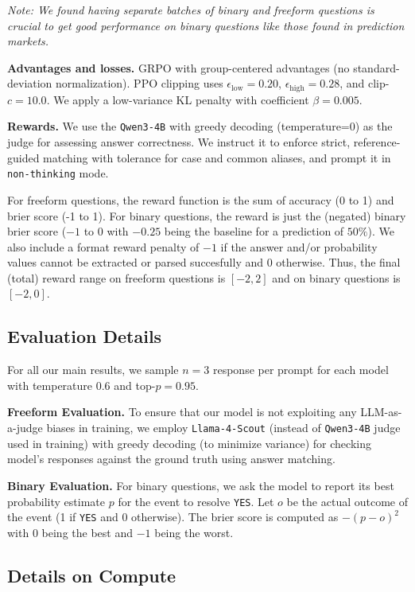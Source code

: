 \emph{{Note:} We found having separate batches of binary and freeform questions is {crucial} to get good performance on binary questions like those found in prediction markets.}

\textbf{Advantages and losses.} GRPO with group-centered advantages (no standard-deviation normalization). PPO clipping uses $\epsilon_{\text{low}}{=}0.20$, $\epsilon_{\text{high}}{=}0.28$, and clip-$c{=}10.0$. We apply a low-variance KL penalty with coefficient $\beta{=}0.005$.

\textbf{Rewards.} We use the \texttt{Qwen3-4B} with greedy decoding (temperature=0) as the judge for assessing answer correctness. We instruct it to enforce strict, reference-guided matching with tolerance for case and common aliases, and prompt it in \texttt{non-thinking} mode. 

For freeform questions, the reward function is the sum of accuracy (0 to 1) and brier score (-1 to 1). For binary questions, the reward is just the (negated) binary brier score ($-1$ to $0$ with $-0.25$ being the baseline for a prediction of $50\%$). We also include a format reward penalty of $-1$ if the answer and/or probability values cannot be extracted or parsed succesfully and $0$ otherwise. Thus, the final (total) reward range on freeform questions is $[-2, 2]$ and on binary questions is $[-2, 0]$.

\subsection{Evaluation Details}

For all our main results, we sample $n=3$ response per prompt for each model with temperature $0.6$ and top-$p=0.95$. 

\textbf{Freeform Evaluation.} To ensure that our model is not exploiting any LLM-as-a-judge biases in training, we employ \texttt{Llama-4-Scout} (instead of \texttt{Qwen3-4B} judge used in training) with greedy decoding (to minimize variance) for checking model's responses against the ground truth using answer matching. 


\textbf{Binary Evaluation.} For binary questions, we ask the model to report its best probability estimate $p$ for the event to resolve \texttt{YES}. Let $o$ be the actual outcome of the event (1 if \texttt{YES} and 0 otherwise). The brier score is computed as $-(p - o)^2$ with $0$ being the best and $-1$ being the worst. 

\subsection{Details on Compute}

